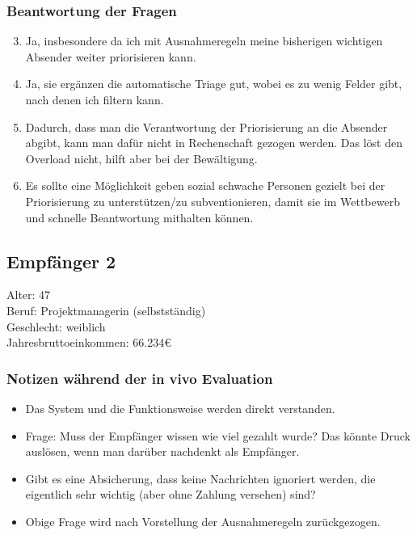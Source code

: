 \subsubsection*{Beantwortung der Fragen}
\begin{enumerate}
\setcounter{enumi}{2}
\item Ja, insbesondere da ich mit Ausnahmeregeln meine bisherigen wichtigen Absender weiter priorisieren kann.
\item Ja, sie ergänzen die automatische Triage gut, wobei es zu wenig Felder gibt, nach denen ich filtern kann.
\item Dadurch, dass man die Verantwortung der Priorisierung an die Absender abgibt, kann man dafür nicht in Rechenschaft gezogen werden. Das löst den Overload nicht, hilft aber bei der Bewältigung.
\item Es sollte eine Möglichkeit geben sozial schwache Personen gezielt bei der Priorisierung zu unterstützen/zu subventionieren, damit sie im Wettbewerb und schnelle Beantwortung mithalten können.
\end{enumerate}

\subsection{Empfänger 2}
Alter: 47 \\
Beruf: Projektmanagerin (selbstständig) \\
Geschlecht: weiblich \\
Jahresbruttoeinkommen: 66.234€

\subsubsection*{Notizen während der in vivo Evaluation}
\begin{itemize}
    \item Das System und die Funktionsweise werden direkt verstanden.
    \item Frage: Muss der Empfänger wissen wie viel gezahlt wurde? Das könnte Druck auslösen, wenn man darüber nachdenkt als Empfänger. 
    \item Gibt es eine Absicherung, dass keine Nachrichten ignoriert werden, die eigentlich sehr wichtig (aber ohne Zahlung versehen) sind?
    \item Obige Frage wird nach Vorstellung der Ausnahmeregeln zurückgezogen.
\end{itemize}

